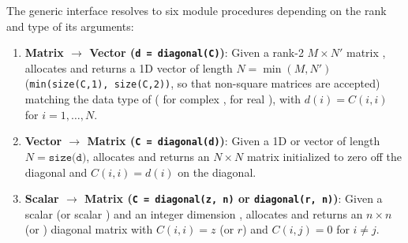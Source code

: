 The generic interface  resolves to six module procedures depending on the rank and type of its arguments:
\begin{enumerate}
  \item \textbf{Matrix $\to$ Vector (\texttt{d = diagonal(C)})}: Given a rank-2 $M\times N'$ matrix , allocates and returns a 1D vector  of length $N = \min(M, N')$ (\texttt{min(size(C,1), size(C,2))}, so that non-square matrices are accepted) matching the data type of  ( for complex ,  for real ), with $d(i) = C(i,i)$ for $i=1,\ldots,N$.
  \item \textbf{Vector $\to$ Matrix (\texttt{C = diagonal(d)})}: Given a 1D  or  vector  of length $N = \texttt{size(d)}$, allocates and returns an $N\times N$ matrix  initialized to zero off the diagonal and $C(i,i) = d(i)$ on the diagonal.
  \item \textbf{Scalar $\to$ Matrix (\texttt{C = diagonal(z, n)} or \texttt{diagonal(r, n)})}: Given a  scalar  (or  scalar ) and an integer dimension , allocates and returns an $n\times n$  (or ) diagonal matrix with $C(i,i) = z$ (or $r$) and $C(i,j) = 0$ for $i\neq j$.
\end{enumerate}

\begin{description}[leftmargin=2.2cm, style=nextline]
\end{description}


